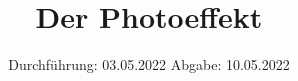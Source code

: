 

\subject{V500}
\title{Der Photoeffekt}
\date{%
  Durchführung: 03.05.2022
  \hspace{3em}
  Abgabe: 10.05.2022
}



\maketitle
\thispagestyle{empty}
\tableofcontents
\newpage






\printbibliography{}

\appendix
\newpage




